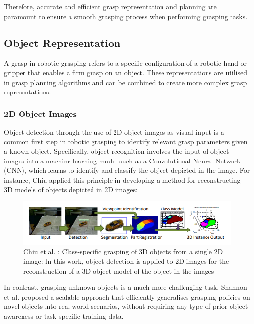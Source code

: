 \documentclass[11pt, a4paper]{report}
\begin{document}
Therefore, accurate and efficient grasp representation and planning are paramount to ensure a smooth grasping process when performing grasping tasks.


\newpage
\subsection{Object Representation}\label{sec:2.1.1}
A grasp in robotic grasping refers to a specific configuration of a robotic hand or gripper that enables a firm grasp on an object. These representations are utilised in grasp planning algorithms and can be combined to create more complex grasp representations.

\subsubsection{2D Object Images}\label{sec:2.1.1.1}
Object detection through the use of 2D object images as visual input is a common first step in robotic grasping to identify relevant grasp parameters given a known object. Specifically, object recognition involves the input of object images into a machine learning model such as a Convolutional Neural Network (CNN), which learns to identify and classify the object depicted in the image. For instance, Chiu \cite{5652597} applied this principle in developing a method for reconstructing 3D models of objects depicted in 2D images:
\begin{figure}[H]
    \centering
    \includegraphics[width=\textwidth]{docs/Project Report/Media/2_1_1_object_detection.png}
    \caption{Chiu et al. \cite{5652597}: Class-specific grasping of 3D objects from a single 2D image: In this work, object detection is applied to 2D images for the reconstruction of a 3D object model of the object in the images}
    \label{fig:2.1}
\end{figure}
In contrast, grasping unknown objects is a much more challenging task. Shannon et al. \cite{Shannon2021} proposed a scalable approach that efficiently generalises grasping policies on novel objects into real-world scenarios, without requiring any type of prior object awareness or task-specific training data.
\end{document}
